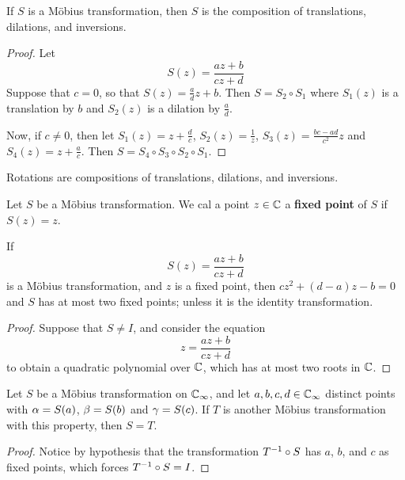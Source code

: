 \begin{lemma}\label{3.3.2}
    If $S$ is a M\"obius transformation, then  $S$ is the composition of
    translations, dilations, and inversions.
\end{lemma}
\begin{proof}
    Let
    \begin{equation*}
        S(z)=\frac{az+b}{cz+d}
    \end{equation*}
    Suppose that $c=0$, so that  $S(z)=\frac{a}{d}z+b$. Then $S=S_2 \circ S_1$
    where $S_1(z)$ is a translation by $b$ and $S_2(z)$ is a dilation by
    $\frac{a}{d}$.

    Now, if $c \neq 0$, then let  $S_1(z)=z+\frac{d}{c}$,
    $S_2(z)=\frac{1}{z}$, $S_3(z)=\frac{bc-ad}{c^2}z$ and
    $S_4(z)=z+\frac{a}{c}$. Then $S=S_4 \circ S_3 \circ S_2 \circ S_1$.
\end{proof}
\begin{corollary}
    Rotations are compositions of translations, dilations, and inversions.
\end{corollary}

\begin{definition}
    Let $S$ be a M\"obius transformation. We cal a point $z \in \mathbb{C}$ a
    \textbf{fixed point} of $S$ if  $S(z)=z$.
\end{definition}

\begin{lemma}\label{3.3.3}
    If
    \begin{equation*}
        S(z)=\frac{az+b}{cz+d}
    \end{equation*}
    is a M\"obius transformation, and $z$ is a fixed point, then
    $cz^2+(d-a)z-b=0$ and $S$ has at most two fixed points; unless it is the
    identity transformation.
\end{lemma}
\begin{proof}
    Suppose that $S \neq I$, and consider the equation
    \begin{equation*}
        z=\frac{az+b}{cz+d}
    \end{equation*}
    to obtain a quadratic polynomial over $\mathbb{C}$, which has at most two roots in
    $\mathbb{C}$.
\end{proof}

\begin{lemma}\label{3.3.4}
    Let $S$ be a M\"obius transformation on  $\mathbb{C}_\infty$, and let  $a,b,c,d \in
    \mathbb{C}_\infty$ distinct points with  $\alpha=S(a)$, $\beta=S(b)$ and $\gamma=S(c)$. If $T$
    is another M\"obius transformation with this property, then  $S=T$.
\end{lemma}
\begin{proof}
    Notice by hypothesis that the transformation $T^{-1} \circ S$ has $a$,
    $b$, and  $c$ as fixed points, which forces  $T^{-1} \circ S=I$.
\end{proof}

